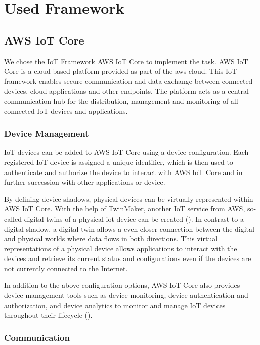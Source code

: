 \chapter{Used Framework}

\section{AWS IoT Core}
We chose the IoT Framework AWS IoT Core to implement the task. 
AWS IoT Core is a cloud-based platform provided as part of the \ac{aws} cloud.
This IoT framework enables secure communication and data exchange between connected devices, cloud applications and other endpoints.
The platform acts as a central communication hub for the distribution, management and monitoring of all connected IoT devices and applications.

\subsection{Device Management}

IoT devices can be added to AWS IoT Core using a device configuration. 
Each registered IoT device is assigned a unique identifier, which is then used to authenticate and authorize the device to interact with AWS IoT Core and in further succession with other applications or device.

By defining device shadows, physical devices can be virtually represented within AWS IoT Core. 
With the help of TwinMaker, another IoT service from AWS, so-called digital twins of a physical \ac{iot} device can be created ({\cite{ref01}}).
In contrast to a digital shadow, a digital twin allows a even closer connection between the digital and physical worlds where data flows in both directions.
This virtual representations of a physical device allows applications to interact with the devices and retrieve its current status and configurations even if the devices are not currently connected to the Internet. 

In addition to the above configuration options, AWS IoT Core also provides device management tools such as device monitoring, device authentication and authorization, and device analytics to monitor and manage IoT devices throughout their lifecycle ({\cite{ref02}}).

\subsection{Communication}

